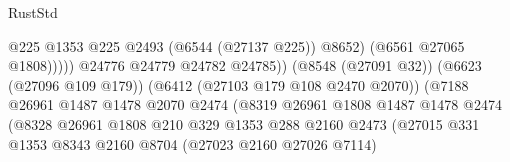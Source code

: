 \begin{lexlean}{RustStd}
\begin{coremodule}
                                                              @225
                                                              @1353
                                                              @225
                                                              @2493
                                                              (@6544 (@27137 @225))
                                                              @8652)
                                                            (@6561 @27065 @1808)))))
                                                    @24776
                                                    @24779
                                                    @24782
                                                    @24785))
                                                (@8548 (@27091 @32))
                                                (@6623 (@27096 @109 @179))
                                                (@6412 (@27103 @179 @108 @2470 @2070))
                                                (@7188
                                                  @26961
                                                  @1487
                                                  @1478
                                                  @2070
                                                  @2474
                                                  (@8319
                                                    @26961
                                                    @1808
                                                    @1487
                                                    @1478
                                                    @2474
                                                    (@8328
                                                      @26961
                                                      @1808
                                                      @210
                                                      @329
                                                      @1353
                                                      @288
                                                      @2160
                                                      @2473
                                                      (@27015
                                                        @331
                                                        @1353
                                                        @8343
                                                        @2160
                                                        @8704
                                                        (@27023 @2160 @27026 @7114)

\end{coremodule}
\end{lexlean}
